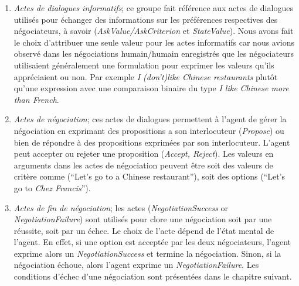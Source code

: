 		\begin{enumerate}
			
			\item \textit{Actes de dialogues informatifs}; ce groupe fait référence aux actes de dialogues utilisés pour échanger des informations sur les préférences respectives des négociateurs, à savoir (\textit{AskValue/AskCriterion} et \textit{StateValue}). 
			Nous avons fait le choix d'attribuer une seule valeur pour les actes informatifs car nous avions observé dans les négociations humain/humain enregistrés que les négociateurs utilisaient généralement une formulation pour exprimer les valeurs qu'ils appréciaient ou non. Par exemple \textit{I (don't)like Chinese restaurants} plutôt qu'une expression avec une comparaison binaire du type \textit{I like Chinese more than French}.
			
			\item \textit{Actes de négociation}; ces actes de dialogues permettent à l'agent de gérer la négociation en exprimant des propositions a son interlocuteur (\textit{Propose}) ou bien de répondre à des propositions exprimées par son interlocuteur. L'agent peut accepter ou rejeter une proposition (\textit{Accept, Reject}). Les valeurs en arguments dans les actes de négociation peuvent être soit des valeurs de critère comme (``Let's go to a Chinese restaurant''), soit des options  (``Let's go to \emph{Chez Francis}''). 
			
			\item \textit{Actes de fin de négociation}; les actes  (\textit{NegotiationSuccess} or \textit{NegotiationFailure}) sont utilisés pour clore une négociation soit par une réussite, soit par un échec. Le choix de l'acte dépend de l'état mental de l'agent. En effet, si une option est acceptée par les deux négociateurs, l'agent exprime alors un \textit{NegotiationSuccess} et termine la négociation. Sinon, si la négociation échoue, alors l'agent exprime un \textit{NegotiationFailure}. Les conditions d'échec d'une négociation sont présentées dans le chapitre suivant. 
			
		\end{enumerate}
		 
		
		
